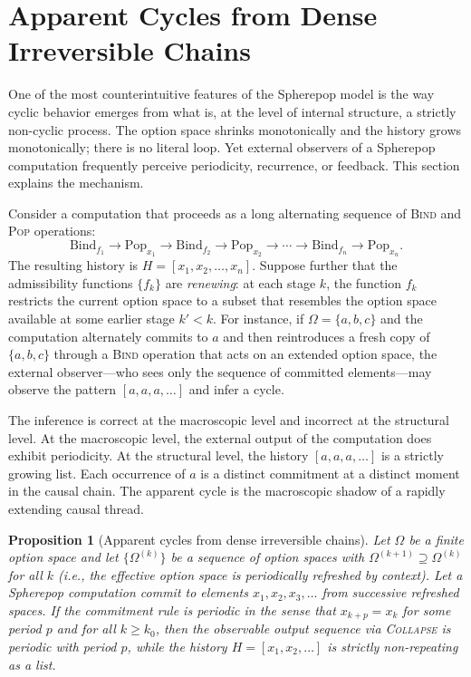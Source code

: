 \documentclass[12pt]{article}
\newtheorem{proposition}{Proposition}[section]
\begin{document}
\section{Apparent Cycles from Dense Irreversible Chains}
\label{sec:emergence}

One of the most counterintuitive features of the Spherepop model is the way cyclic behavior emerges from what is, at the level of internal structure, a strictly non-cyclic process. The option space shrinks monotonically and the history grows monotonically; there is no literal loop. Yet external observers of a Spherepop computation frequently perceive periodicity, recurrence, or feedback. This section explains the mechanism.

Consider a computation that proceeds as a long alternating sequence of \textsc{Bind} and \textsc{Pop} operations:
\[
\mathrm{Bind}_{f_1} \to \mathrm{Pop}_{x_1} \to \mathrm{Bind}_{f_2} \to \mathrm{Pop}_{x_2} \to \cdots \to \mathrm{Bind}_{f_n} \to \mathrm{Pop}_{x_n}.
\]
The resulting history is $H = [x_1, x_2, \ldots, x_n]$. Suppose further that the admissibility functions $\{f_k\}$ are \emph{renewing}: at each stage $k$, the function $f_k$ restricts the current option space to a subset that resembles the option space available at some earlier stage $k' < k$. For instance, if $\Omega = \{a, b, c\}$ and the computation alternately commits to $a$ and then reintroduces a fresh copy of $\{a, b, c\}$ through a \textsc{Bind} operation that acts on an extended option space, the external observer---who sees only the sequence of committed elements---may observe the pattern $[a, a, a, \ldots]$ and infer a cycle.

The inference is correct at the macroscopic level and incorrect at the structural level. At the macroscopic level, the external output of the computation does exhibit periodicity. At the structural level, the history $[a, a, a, \ldots]$ is a strictly growing list. Each occurrence of $a$ is a distinct commitment at a distinct moment in the causal chain. The apparent cycle is the macroscopic shadow of a rapidly extending causal thread.

\begin{proposition}[Apparent cycles from dense irreversible chains]
Let $\Omega$ be a finite option space and let $\{\Omega^{(k)}\}$ be a sequence of option spaces with $\Omega^{(k+1)} \supseteq \Omega^{(k)}$ for all $k$ (i.e., the effective option space is periodically refreshed by context). Let a Spherepop computation commit to elements $x_1, x_2, x_3, \ldots$ from successive refreshed spaces. If the commitment rule is periodic in the sense that $x_{k+p} = x_k$ for some period $p$ and for all $k \geq k_0$, then the observable output sequence via \textsc{Collapse} is periodic with period $p$, while the history $H = [x_1, x_2, \ldots]$ is strictly non-repeating as a list.
\end{proposition}
\end{document}
